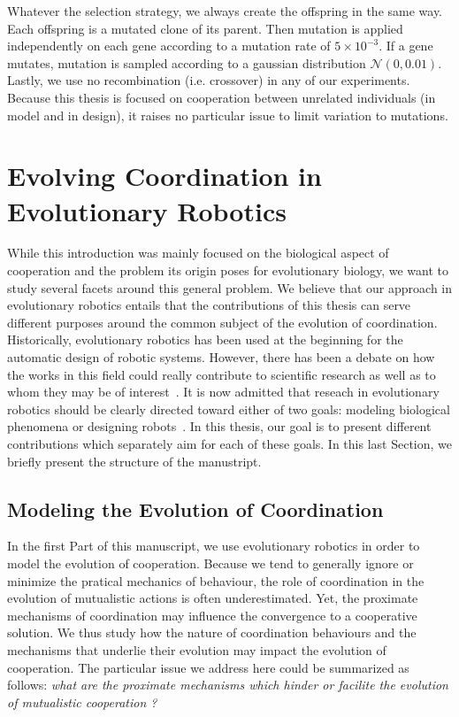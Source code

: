 
        Whatever the selection strategy, we always create the offspring in the same way. Each offspring is a mutated clone of its parent. Then mutation is applied independently on each gene according to a mutation rate of \(5 \times 10^{-3}\). If a gene mutates, mutation is sampled according to a gaussian distribution \(\mathcal{N}(0, 0.01)\). Lastly, we use no recombination (i.e. crossover) in any of our experiments. Because this thesis is focused on cooperation between unrelated individuals (in model and in design), it raises no particular issue to limit variation to mutations.


\section{Evolving Coordination in Evolutionary Robotics}

  While this introduction was mainly focused on the biological aspect of cooperation and the problem its origin poses for evolutionary biology, we want to study several facets around this general problem. We believe that our approach in evolutionary robotics entails that the contributions of this thesis can serve different purposes around the common subject of the evolution of coordination. Historically, evolutionary robotics has been used at the beginning for the automatic design of robotic systems. However, there has been a debate on how the works in this field could really contribute to scientific research as well as to whom they may be of interest~\parencite{Trianni2014b, Doncieux2015a}. It is now admitted that reseach in evolutionary robotics should be clearly directed toward either of two goals: modeling biological phenomena or designing robots~\parencite{Trianni2014b}. In this thesis, our goal is to present different contributions which separately aim for each of these goals. In this last Section, we briefly present the structure of the manustript.
  
  \subsection{Modeling the Evolution of Coordination}

    In the first Part of this manuscript, we use evolutionary robotics in order to model the evolution of cooperation. Because we tend to generally ignore or minimize the pratical mechanics of behaviour, the role of coordination in the evolution of mutualistic actions is often underestimated. Yet, the proximate mechanisms of coordination may influence the convergence to a cooperative solution. We thus study how the nature of coordination behaviours and the mechanisms that underlie their evolution may impact the evolution of cooperation. The particular issue we address here could be summarized as follows: \emph{what are the proximate mechanisms which hinder or facilite the evolution of mutualistic cooperation ?}

